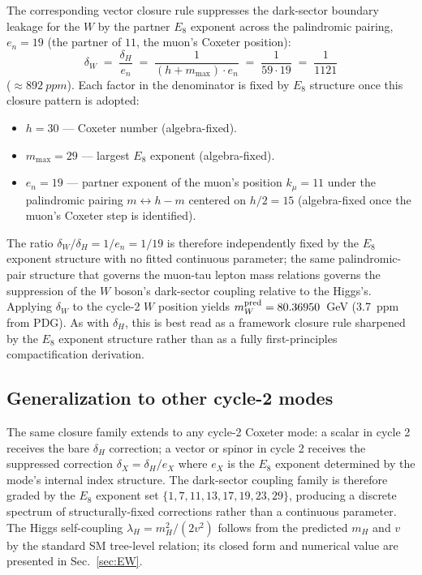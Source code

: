 ﻿\documentclass[reprint,amsmath,amssymb,aps,prd,longbibliography,floatfix]{revtex4-2}
\begin{document}
The corresponding vector closure rule suppresses the dark-sector
boundary leakage for the $W$ by the partner $E_8$ exponent across the
palindromic pairing,
$e_n = 19$ (the partner of $11$, the muon's Coxeter position):
\begin{equation}
\boxed{\delta_W \;=\; \frac{\delta_H}{e_n} \;=\; \frac{1}{(h + m_{\max}) \cdot e_n} \;=\; \frac{1}{59 \cdot 19} \;=\; \frac{1}{1121}}
\label{eq:deltaW_derived}
\end{equation}
($\approx \SI{892}{ppm}$). Each factor in the denominator is fixed by
$E_8$ structure once this closure pattern is adopted:
\begin{itemize}
\item $h = 30$ --- Coxeter number (algebra-fixed).
\item $m_{\max} = 29$ --- largest $E_8$ exponent (algebra-fixed).
\item $e_n = 19$ --- partner exponent of the muon's position $k_\mu = 11$
  under the palindromic pairing $m \leftrightarrow h - m$ centered on
  $h/2 = 15$ (algebra-fixed once the muon's Coxeter step is identified).
\end{itemize}
The ratio $\delta_W/\delta_H = 1/e_n = 1/19$ is therefore
independently fixed by the $E_8$ exponent structure with no fitted
continuous parameter; the same palindromic-pair structure that governs the
muon-tau lepton mass relations governs the suppression of the $W$
boson's dark-sector coupling relative to the Higgs's. Applying
$\delta_W$ to the cycle-2 $W$ position yields
$m_W^{\rm pred} = 80.36950$~GeV (\SI{3.7}{ppm} from PDG). As with
$\delta_H$, this is best read as a framework closure rule sharpened by
the $E_8$ exponent structure rather than as a fully first-principles
compactification derivation.

\subsection{Generalization to other cycle-2 modes}

The same closure family extends to any cycle-2 Coxeter mode: a scalar
in cycle 2 receives the bare $\delta_H$ correction; a vector or
spinor in cycle 2 receives the suppressed correction
$\delta_X = \delta_H / e_X$ where $e_X$ is the $E_8$ exponent
determined by the mode's internal index structure. The dark-sector
coupling family is therefore graded by the $E_8$ exponent set
$\{1, 7, 11, 13, 17, 19, 23, 29\}$, producing a discrete spectrum
of structurally-fixed corrections rather than a continuous parameter.
The Higgs self-coupling $\lambda_H = m_H^2/(2 v^2)$ follows from the
predicted $m_H$ and $v$ by the standard SM tree-level relation; its
closed form and numerical value are presented in
Sec.~\ref{sec:EW}.
\end{document}
